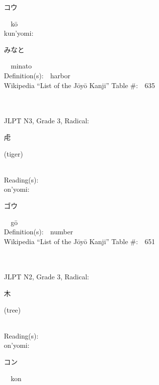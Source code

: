 \begin{multicols}{2}
{\hspace*{2em}}{\begin{CJK}{UTF8}{min} コウ \end{CJK}}\ \ k\=o\ \ \\
{\hspace*{1em}}kun'yomi:\ \ \\
{\hspace*{2em}}{\begin{CJK}{UTF8}{min} みなと \end{CJK}}\ \ minato\ \ \\
Definition(s):\ \ harbor \\
Wikipedia ``List of the J\=oy\=o Kanji'' Table \#:\ \ 635 \\
\ \ \\
{\fontsize{34pt}{40pt}  }\ \ \\  %
{JLPT N3, Grade 3, Radical:\ \ {\begin{CJK}{UTF8}{min} 虍 \end{CJK}} (tiger) } \\
Reading(s):\ \ \\
{\hspace*{1em}}on'yomi:\ \ \\
{\hspace*{2em}}{\begin{CJK}{UTF8}{min} ゴウ \end{CJK}}\ \ g\=o\ \ \\
Definition(s):\ \ number \\
Wikipedia ``List of the J\=oy\=o Kanji'' Table \#:\ \ 651 \\
\ \ \\
{\fontsize{34pt}{40pt}  }\ \ \\  %
{JLPT N2, Grade 3, Radical:\ \ {\begin{CJK}{UTF8}{min} 木 \end{CJK}} (tree) } \\
Reading(s):\ \ \\
{\hspace*{1em}}on'yomi:\ \ \\
{\hspace*{2em}}{\begin{CJK}{UTF8}{min} コン \end{CJK}}\ \ kon\ \ \\

\end{multicols}
